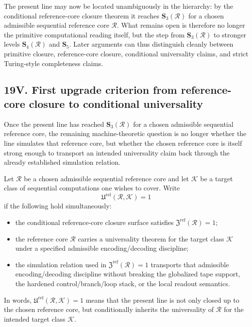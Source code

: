 \begin{corollary}
The present line may now be located unambiguously in the hierarchy: by the conditional reference-core closure theorem it reaches $\mathbf S_3(\mathcal R)$ for a chosen admissible sequential reference core $\mathcal R$. What remains open is therefore no longer the primitive computational reading itself, but the step from $\mathbf S_3(\mathcal R)$ to stronger levels $\mathbf S_4(\mathcal R)$ and $\mathbf S_5$. Later arguments can thus distinguish cleanly between primitive closure, reference-core closure, conditional universality claims, and strict Turing-style completeness claims.
\end{corollary}


\subsection*{19V. First upgrade criterion from reference-core closure to conditional universality}
Once the present line has reached \(\mathbf S_3(\mathcal R)\) for a chosen admissible sequential reference core, the remaining machine-theoretic question is no longer whether the line simulates that reference core, but whether the chosen reference core is itself strong enough to transport an intended universality claim back through the already established simulation relation.

\begin{definition}
Let \(\mathcal R\) be a chosen admissible sequential reference core and let \(\mathcal K\) be a target class of sequential computations one wishes to cover. Write
\[
\mathfrak U^{\mathrm{rel}}(\mathcal R,\mathcal K)=1
\]
if the following hold simultaneously:
\begin{itemize}[leftmargin=2em]
  \item the conditional reference-core closure surface satisfies \(\mathfrak Z^{\mathrm{ref}}(\mathcal R)=1\);
  \item the reference core \(\mathcal R\) carries a universality theorem for the target class \(\mathcal K\) under a specified admissible encoding/decoding discipline;
  \item the simulation relation used in \(\mathfrak Z^{\mathrm{ref}}(\mathcal R)=1\) transports that admissible encoding/decoding discipline without breaking the globalized tape support, the hardened control/branch/loop stack, or the local readout semantics.
\end{itemize}
In words, \(\mathfrak U^{\mathrm{rel}}(\mathcal R,\mathcal K)=1\) means that the present line is not only closed up to the chosen reference core, but conditionally inherits the universality of \(\mathcal R\) for the intended target class \(\mathcal K\).
\end{definition}

